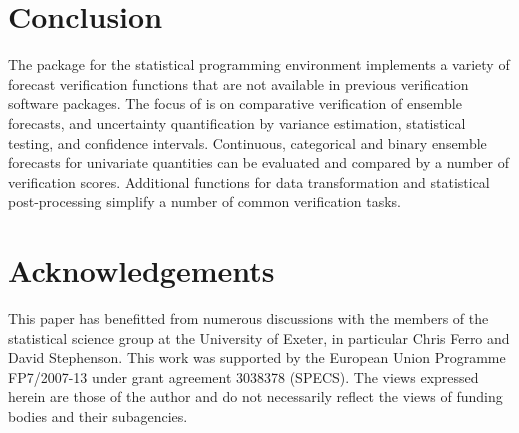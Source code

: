 \documentclass[article]{jss}\usepackage[]{graphicx}\usepackage[]{color}
\begin{document}
\section{Conclusion}

The package  for the  statistical programming environment implements a variety of forecast verification functions that are not available in previous verification software packages.
The focus of  is on comparative verification of ensemble forecasts, and uncertainty quantification by variance estimation, statistical testing, and confidence intervals.
Continuous, categorical and binary ensemble forecasts for univariate quantities can be evaluated and compared by a number of verification scores.
Additional functions for data transformation and statistical post-processing simplify a number of common verification tasks.


\section*{Acknowledgements}

This paper has benefitted from numerous discussions with the members of the statistical science group at the University of Exeter, in particular Chris Ferro and David Stephenson.
This work was supported by the European Union Programme FP7/2007-13 under grant agreement 3038378 (SPECS).
The views expressed herein are those of the author and do not necessarily reflect the views of funding bodies and their subagencies.



\end{document}
